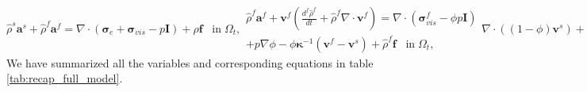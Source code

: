 %
\begin{subequations}
\begin{equation}
\hat\rho^{s} \boldsymbol{a}^{s}+\hat \rho^{f} \boldsymbol{a}^{f} = \nabla \cdot( \boldsymbol{\sigma}_{e}+\boldsymbol{\sigma}_{vis}-p\boldsymbol{I}) + \rho\boldsymbol{f} \;\;\; \mbox{in} \; \Omega_{t},
\end{equation}
\begin{multline}
\hat\rho^{f}\boldsymbol{a}^{f}+  \boldsymbol{v}^{f}\left(  \frac{d^{f}\hat{\rho}^{f}  }{dt}  + \hat{\rho}^{f}  \nabla \cdot \boldsymbol{v}^{f} \right)=\nabla \cdot( \boldsymbol{\sigma}_{vis}^{f}- \phi p \boldsymbol{I}) \\+ p \nabla \phi - \phi \boldsymbol{\kappa}^{-1}(\boldsymbol{v}^{f}-\boldsymbol{v}^{s}) + \hat\rho^{f}\boldsymbol{f}  \;\;\; \mbox{in} \; \Omega_{t}, 
\end{multline}
\begin{equation}
\nabla \cdot((1-\phi) \boldsymbol{v}^{s}) + \nabla \cdot (\phi \boldsymbol{v}^f)=g \;\;\;\;\;\mbox{in}\;\Omega_{t},
\end{equation}
\begin{equation}
\boldsymbol{\chi} =\boldsymbol{X}+\boldsymbol{u}_{D}   \;\;\; \mbox{on}\; \Gamma_{d},
\end{equation}
\begin{equation}
(\boldsymbol{\sigma}_{e}+\boldsymbol{\sigma}_{vis}-p\boldsymbol{I})\boldsymbol{n} = \boldsymbol{t}_{N}   \;\;\; \mbox{on}\; \Gamma_{t},
\end{equation}
\begin{equation}
\boldsymbol{v}^{f}   = \boldsymbol{v}^{f}_{D}  \;\;\; \mbox{on}\; \Gamma_{f},
\end{equation}
\begin{equation}
\mu_{f} \phi \frac{\partial \boldsymbol{v}^{f}}{\partial \boldsymbol{n}}- \phi p\boldsymbol{n}=\hat{\boldsymbol{s}}  \;\;\; \mbox{on}\; \Gamma_{p},
\end{equation}
\begin{equation}
\boldsymbol{\chi}(0) = \boldsymbol{X} + \boldsymbol{u}^{0},  \;\;\; \boldsymbol{v}^{s}(0) = {\boldsymbol{v}^{s0}},  \;\;\;\boldsymbol{v}^{f}(0) = {\boldsymbol{v}^{f0}} \;\;\;  \mbox{in}\;\Omega_{0}.
\end{equation}
\label{eqn:full_mixture_model}
\end{subequations}
We have summarized all the variables and corresponding equations in table \ref{tab:recap_full_model}. 
%
%
